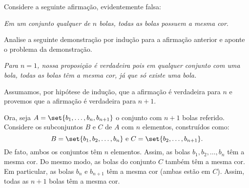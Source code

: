 \begin{example}
Considere a seguinte afirmação, evidentemente falsa:

\textit{Em um conjunto qualquer de $n$ bolas, todas as bolas possuem a mesma cor}.

Analise a seguinte demonstração por indução para a afirmação anterior e aponte o problema da demonstração.

{\it Para $n=1$, nossa proposição é verdadeira pois em qualquer conjunto com uma bola, todas as bolas têm a mesma cor, já que só existe uma bola. 

Assumamos, por hipótese de indução, que a afirmação é verdadeira para $n$ e provemos que a afirmação é verdadeira para
$n+1$.

Ora, seja $A = \set {b_1, \dots, b_n, b_{n+1}}$ o conjunto  com $n+1$ bolas referido. Considere os subconjuntos $B$ e $C$ de $A$ com $n$ elementos, construídos como:
%
\begin{equation*}
B = \set {b_1, b_2, \dots, b_n} \text{ e } C= \set{ b_2, \dots, b_{n+1}}.
\end{equation*}
%
De fato, ambos os conjuntos têm $n$ elementos. Assim, as bolas $b_1, b_2, \dots , b_n$ têm a mesma cor. Do mesmo modo, as bolas do conjunto $C$ também têm a mesma cor. Em particular, as bolas $b_n$ e $b_{n+1}$ têm a mesma cor (ambas estão em $C$). Assim, todas as $n+1$ bolas têm a mesma cor.}
\end{example}
